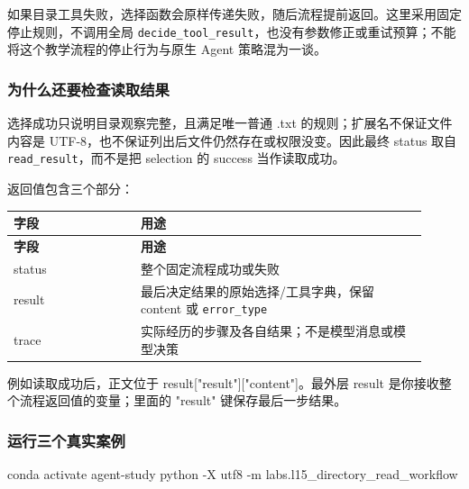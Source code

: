 如果目录工具失败，选择函数会原样传递失败，随后流程提前返回。这里采用固定停止规则，不调用全局 \nolinkurl{decide_tool_result}，也没有参数修正或重试预算；不能将这个教学流程的停止行为与原生 Agent 策略混为一谈。

\subsubsection{为什么还要检查读取结果}

选择成功只说明目录观察完整，且满足唯一普通 .txt 的规则；扩展名不保证文件内容是 UTF-8，也不保证列出后文件仍然存在或权限没变。因此最终 status 取自 \nolinkurl{read_result}，而不是把 selection 的 success 当作读取成功。

返回值包含三个部分：

{\small\setlength{\tabcolsep}{4pt}
\renewcommand{\arraystretch}{1.25}
\begin{longtable}{>{\raggedright\arraybackslash}p{0.28\linewidth}>{\raggedright\arraybackslash}p{0.63\linewidth}}
\toprule
\textbf{字段} & \textbf{用途} \\
\midrule\endfirsthead
\toprule
\textbf{字段} & \textbf{用途} \\
\midrule\endhead
\bottomrule\endfoot
status & 整个固定流程成功或失败 \\
result & 最后决定结果的原始选择/工具字典，保留 content 或 \nolinkurl{error_type} \\
trace & 实际经历的步骤及各自结果；不是模型消息或模型决策 \\
\end{longtable}}

例如读取成功后，正文位于 result["result"]["content"]。最外层 result 是你接收整个流程返回值的变量；里面的 "result" 键保存最后一步结果。

\subsubsection{运行三个真实案例}

\begin{Code}
conda activate agent-study
python -X utf8 -m labs.l15_directory_read_workflow
\end{Code}

